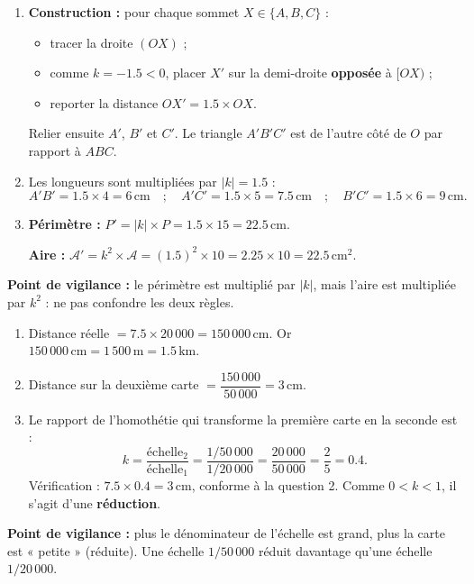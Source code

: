 \documentclass[11pt]{article}
\begin{document}
\begin{corrige}
\begin{enumerate}
\item \textbf{Construction :} pour chaque sommet $X \in \{A, B, C\}$ :
\begin{itemize}
\item tracer la droite $(OX)$ ;
\item comme $k = -\num{1,5} < 0$, placer $X'$ sur la demi-droite \textbf{opposée} à $[OX)$ ;
\item reporter la distance $OX' = \num{1,5} \times OX$.
\end{itemize}
Relier ensuite $A'$, $B'$ et $C'$. Le triangle $A'B'C'$ est de l'autre côté de $O$ par rapport à $ABC$.
\item Les longueurs sont multipliées par $|k| = \num{1,5}$ :
\[A'B' = \num{1,5} \times 4 = 6\,\text{cm} \quad ; \quad A'C' = \num{1,5} \times 5 = \num{7,5}\,\text{cm} \quad ; \quad B'C' = \num{1,5} \times 6 = 9\,\text{cm}.\]
\item \textbf{Périmètre :} $P' = |k| \times P = \num{1,5} \times 15 = \num{22,5}\,\text{cm}$.

\textbf{Aire :} $\mathcal{A}' = k^2 \times \mathcal{A} = (\num{1,5})^2 \times 10 = \num{2,25} \times 10 = \num{22,5}\,\text{cm}^2$.
\end{enumerate}
\textbf{Point de vigilance :} le périmètre est multiplié par $|k|$, mais l'aire est multipliée par $k^2$ : ne pas confondre les deux règles.
\end{corrige}

\begin{corrige}
\begin{enumerate}
\item Distance réelle $= \num{7,5} \times 20\,000 = 150\,000\,\text{cm}$. Or $150\,000\,\text{cm} = 1\,500\,\text{m} = \num{1,5}\,\text{km}$.
\item Distance sur la deuxième carte $= \dfrac{150\,000}{50\,000} = 3\,\text{cm}$.
\item Le rapport de l'homothétie qui transforme la première carte en la seconde est :
\[k = \dfrac{\text{échelle}_2}{\text{échelle}_1} = \dfrac{1/50\,000}{1/20\,000} = \dfrac{20\,000}{50\,000} = \dfrac{2}{5} = \num{0,4}.\]
Vérification : $\num{7,5} \times \num{0,4} = 3\,\text{cm}$, conforme à la question 2. Comme $0 < k < 1$, il s'agit d'une \textbf{réduction}.
\end{enumerate}
\textbf{Point de vigilance :} plus le dénominateur de l'échelle est grand, plus la carte est « petite » (réduite). Une échelle $1/50\,000$ réduit davantage qu'une échelle $1/20\,000$.
\end{corrige}
\end{document}
